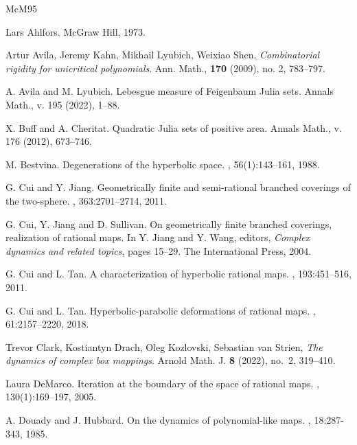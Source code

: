 \documentclass[11pt, reqno]{amsart}
\numberwithin{equation}{section}
\theoremstyle{plain}
\theoremstyle{theorem}
\theoremstyle{plain}
\theoremstyle{definition}
\numberwithin{figure}{section}
\begin{document}

\begin{thebibliography}{McM95}



Lars Ahlfors.
\newblock McGraw Hill, 1973.

Artur Avila, Jeremy Kahn, Mikhail Lyubich, Weixiao Shen, \emph{Combinatorial rigidity for unicritical polynomials}. Ann. Math., \textbf{170} (2009), no. 2, 783--797.



 A. Avila and M. Lyubich. 
Lebesgue measure of Feigenbaum Julia sets. Annals Math., v. 195 (2022), 1--88.


 X. Buff and A. Cheritat. Quadratic Julia sets of
  positive area. Annals Math., v. 176 (2012), 673--746.


M. Bestvina.
\newblock Degenerations of the hyperbolic space.
, 56(1):143--161, 1988.

G. Cui and Y. Jiang.
\newblock Geometrically finite and semi-rational branched coverings of the two-sphere.
, 363:2701--2714, 2011.

G. Cui, Y. Jiang and D. Sullivan.
\newblock On geometrically finite branched coverings, realization of rational maps.
\newblock In Y. Jiang and Y. Wang, editors, {\em
  Complex dynamics and related topics}, pages 15--29. The International Press,
  2004.

G. Cui and L. Tan.
\newblock A characterization of hyperbolic rational maps.
, 193:451--516, 2011.

G. Cui and L. Tan.
\newblock Hyperbolic-parabolic deformations of rational maps.
, 61:2157--2220, 2018.

 Trevor Clark, Kostiantyn Drach, Oleg Kozlovski, Sebastian van Strien, \emph{The dynamics of complex box mappings}. Arnold Math. J. \textbf{8} (2022), no.~2, 319--410. 

Laura DeMarco.
\newblock Iteration at the boundary of the space of rational maps.
, 130(1):169--197, 2005.

A. Douady and J. Hubbard.
\newblock On the dynamics of polynomial-like maps.
, 18:287-343, 1985.


\end{thebibliography}
\end{document}
